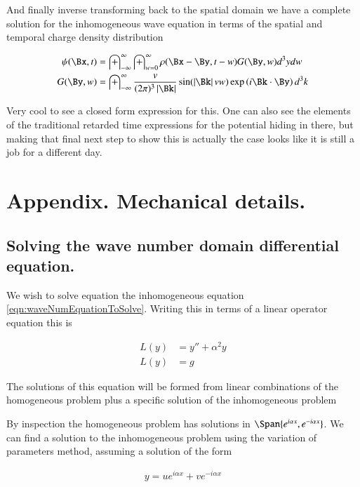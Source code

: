 \documentclass{article}
\newcommand{\IIinf}[0]{ \int_{-\infty}^\infty }
\begin{document}
And finally inverse transforming back to the spatial domain we have a complete solution for the inhomogeneous wave equation in terms of the spatial and temporal charge density distribution

\begin{align}
{\psi}(\Bx, t) 
&= \IIinf \int_{w = 0}^\infty \rho(\Bx -\By, t-w) G(\By, w) d^3 y dw \\
G(\By, w) 
&= \IIinf
\frac{v}{(2\pi)^3 \Abs{\Bk}} 
\sin( \Abs{\Bk} v w ) 
\exp\left( i \Bk \cdot \By \right) 
d^3 k
\end{align}

Very cool to see a closed form expression for this.
One can also see the elements of the traditional retarded time expressions for the potential hiding in there, but making that final next step to show this is actually
the case looks like it is
still a job for a different day.

\section{ Appendix.  Mechanical details. }

\subsection{ Solving the wave number domain differential equation. }

We wish to solve equation the inhomogeneous equation \ref{eqn:waveNumEquationToSolve}.  Writing this in terms of a linear operator equation this is

\begin{align*}
L(y) &= y'' + \alpha^2 y \\
L(y) &= g
\end{align*}

The solutions of this equation will be formed from linear combinations of the homogeneous problem plus a specific solution of the inhomogeneous problem

By inspection the homogeneous problem has solutions in $\Span \{ e^{ i \alpha x }, e^{ -i \alpha x }\}$.
We can find a solution to the inhomogeneous problem using the variation of parameters method, assuming a solution of the form

\begin{align*}
y  = u e^{ i \alpha x } + v e^{ -i \alpha x }
\end{align*}
\end{document}
